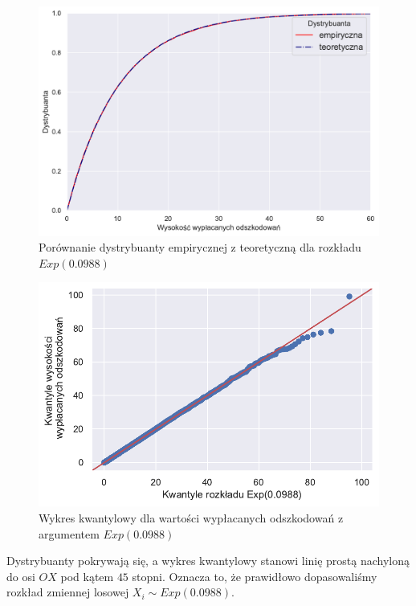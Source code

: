 \documentclass[12pt]{mwart}
\begin{document}
	\begin{figure}[H]
	\begin{center}
		\includegraphics[scale=0.5]{dystrybuanta1.pdf}
		\caption{Porównanie dystrybuanty empirycznej z teoretyczną dla rozkładu $Exp(0.0988)$}
	\end{center}
	\end{figure}
	
	
	\begin{figure}[H]
	\begin{center}
		\includegraphics[scale=0.7]{qqplot1.pdf}
		\caption{Wykres kwantylowy dla wartości wypłacanych odszkodowań z argumentem $Exp(0.0988)$}
	\end{center}
	\end{figure}
	
	\noindent Dystrybuanty pokrywają się, a wykres kwantylowy stanowi linię prostą nachyloną do osi $OX$ pod kątem $45$ stopni. Oznacza to, że prawidłowo dopasowaliśmy rozkład zmiennej losowej $X_i \sim Exp(0.0988)$.
	
\end{document}

